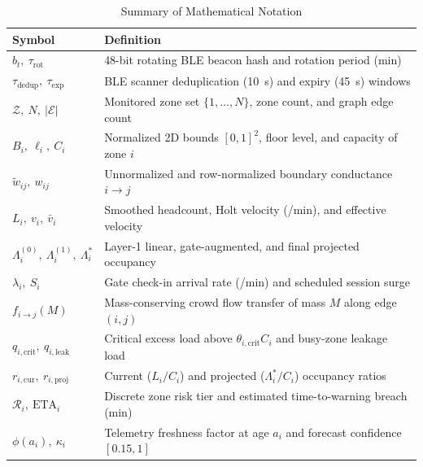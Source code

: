 \documentclass[conference,a4paper]{IEEEtran}
\begin{document}
\begin{table}[!t]
\centering
\caption{Summary of Mathematical Notation}
\label{tab:notation}
\footnotesize
\setlength{\tabcolsep}{3pt}
\renewcommand{\arraystretch}{1.08}
\begin{tabularx}{\columnwidth}{@{}>{\centering\arraybackslash}p{}L@{}}
\toprule
\textbf{Symbol} & \textbf{Definition} \\
\midrule
$b_t,\ \tau_{\mathrm{rot}}$ & 48-bit rotating BLE beacon hash and rotation period (min) \\
$\tau_{\mathrm{dedup}},\ \tau_{\mathrm{exp}}$ & BLE scanner deduplication (10~s) and expiry (45~s) windows \\
$\mathcal{Z},\ N,\ |\mathcal{E}|$ & Monitored zone set $\{1,\dots,N\}$, zone count, and graph edge count \\
$B_i,\ \ell_i,\ C_i$ & Normalized 2D bounds $[0,1]^2$, floor level, and capacity of zone $i$ \\
$\tilde{w}_{ij},\ w_{ij}$ & Unnormalized and row-normalized boundary conductance $i \to j$ \\
$L_i,\ v_i,\ \bar{v}_i$ & Smoothed headcount, Holt velocity (/min), and effective velocity \\
$\Lambda_i^{(0)},\ \Lambda_i^{(1)},\ \Lambda_i^*$ & Layer-1 linear, gate-augmented, and final projected occupancy \\
$\lambda_i,\ S_i$ & Gate check-in arrival rate (/min) and scheduled session surge \\
$f_{i \to j}(M)$ & Mass-conserving crowd flow transfer of mass $M$ along edge $(i,j)$ \\
$q_{i,\mathrm{crit}},\ q_{i,\mathrm{leak}}$ & Critical excess load above $\theta_{i,\mathrm{crit}}C_i$ and busy-zone leakage load \\
$r_{i,\mathrm{cur}},\ r_{i,\mathrm{proj}}$ & Current ($L_i/C_i$) and projected ($\Lambda_i^*/C_i$) occupancy ratios \\
$\mathcal{R}_i,\ \mathrm{ETA}_i$ & Discrete zone risk tier and estimated time-to-warning breach (min) \\
$\phi(a_i),\ \kappa_i$ & Telemetry freshness factor at age $a_i$ and forecast confidence $[0.15,1]$ \\
\bottomrule
\end{tabularx}
\end{table}
\end{document}
